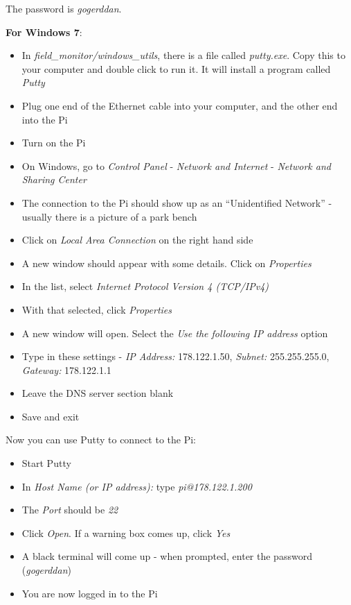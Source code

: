 \documentclass[10pt]{article}
\begin{document}
The password is \textit{gogerddan}. \newline

\textbf{For Windows 7}:

\begin{itemize}
 \item In \textit{field\_monitor/windows\_utils}, there is a file called \textit{putty.exe}. Copy this to your computer and double click to run it. It will install a program called \textit{Putty}
 \item Plug one end of the Ethernet cable into your computer, and the other end into the Pi
 \item Turn on the Pi
 \item On Windows, go to \textit{Control Panel} - \textit{Network and Internet} - \textit{Network and Sharing Center}
 \item The connection to the Pi should show up as an ``Unidentified Network'' - usually there is a picture of a park bench
 \item Click on \textit{Local Area Connection} on the right hand side
 \item A new window should appear with some details. Click on \textit{Properties}
 \item In the list, select \textit{Internet Protocol Version 4 (TCP/IPv4)}
 \item With that selected, click \textit{Properties}
 \item A new window will open. Select the \textit{Use the following IP address} option
 \item Type in these settings - \textit{IP Address:} 178.122.1.50, \textit{Subnet:} 255.255.255.0, \textit{Gateway:} 178.122.1.1
 \item Leave the DNS server section blank
 \item Save and exit
\end{itemize}

Now you can use Putty to connect to the Pi:

\begin{itemize}
 \item Start Putty
 \item In \textit{Host Name (or IP address):} type \textit{pi@178.122.1.200}
 \item The \textit{Port} should be \textit{22}
 \item Click \textit{Open}. If a warning box comes up, click \textit{Yes}
 \item A black terminal will come up - when prompted, enter the password (\textit{gogerddan})
 \item You are now logged in to the Pi
\end{itemize}
\end{document}
